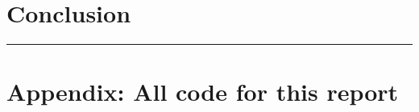 \documentclass[
]{article}
\begin{document}
\newpage

\hypertarget{conclusion}{%
\section{Conclusion}\label{conclusion}}

\begin{center}\rule{0.5\linewidth}{0.5pt}\end{center}

\newpage

\hypertarget{appendix-all-code-for-this-report}{%
\section{Appendix: All code for this
report}\label{appendix-all-code-for-this-report}}
\end{document}
